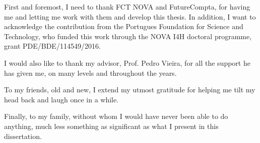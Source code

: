 


\begin{ntacknowledgements}

First and foremost, I need to thank FCT NOVA and FutureCompta, for
having me and letting me work with them and develop this thesis. In
addition, I want to acknowledge the contribution from the Portugues
Foundation for Science and Technology, who funded this work through the
NOVA I4H doctoral programme, grant PDE/BDE/114549/2016.

I would also like to thank my advisor, Prof. Pedro Vieira, for all the
support he has given me, on many levels and throughout the years.

To my friends, old and new, I extend my utmost gratitude for helping me
tilt my head back and laugh once in a while.

Finally, to my family, without whom I would have never been able to do
anything, much less something as significant as what I present in this
dissertation.

\end{ntacknowledgements}

